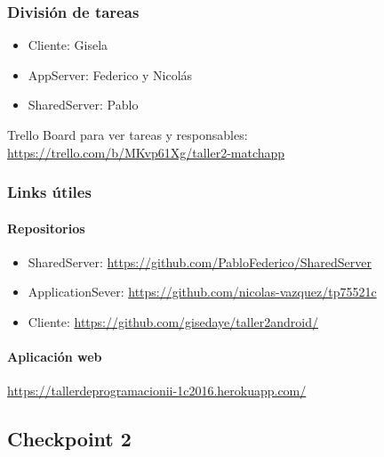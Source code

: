 \documentclass[letterpaper,10pt,english]{sphinxmanual}
\begin{document}
\subsubsection{División de tareas}
\label{manuals:division-de-tareas}\begin{itemize}
\item {} 
Cliente: Gisela

\item {} 
AppServer: Federico y Nicolás

\item {} 
SharedServer: Pablo

\end{itemize}

Trello Board para ver tareas y responsables:
\href{https://trello.com/b/MKvp61Xg/taller2-matchapp}{https://trello.com/b/MKvp61Xg/taller2-matchapp}


\subsubsection{Links útiles}
\label{manuals:links-utiles}

\paragraph{Repositorios}
\label{manuals:repositorios}\begin{itemize}
\item {} 
SharedServer: \href{https://github.com/PabloFederico/SharedServer}{https://github.com/PabloFederico/SharedServer}

\item {} 
ApplicationSever: \href{https://github.com/nicolas-vazquez/tp75521c}{https://github.com/nicolas-vazquez/tp75521c}

\item {} 
Cliente: \href{https://github.com/gisedaye/taller2android/}{https://github.com/gisedaye/taller2android/}

\end{itemize}


\paragraph{Aplicación web}
\label{manuals:aplicacion-web}
\href{https://tallerdeprogramacionii-1c2016.herokuapp.com/}{https://tallerdeprogramacionii-1c2016.herokuapp.com/}


\subsection{Checkpoint 2}
\label{manuals:checkpoint-2}
\end{document}
